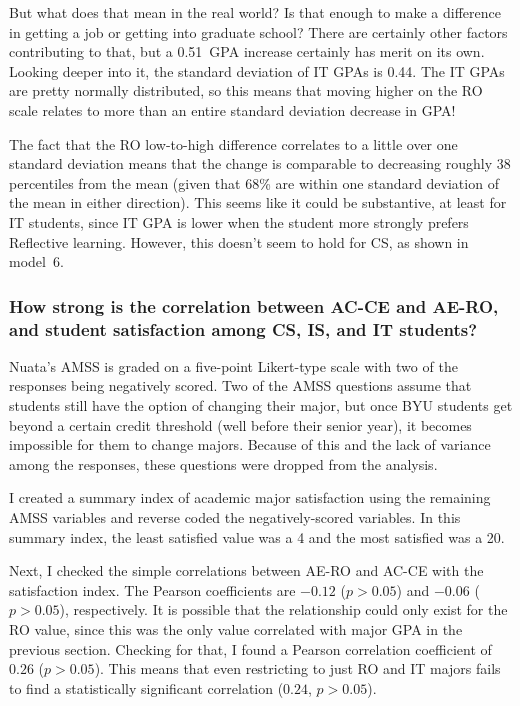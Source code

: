 But what does that mean in the real world? Is that enough to make a difference in getting a job or getting into graduate school? There are certainly other factors contributing to that, but a 0.51~GPA increase certainly has merit on its own. Looking deeper into it, the standard deviation of IT GPAs is 0.44. The IT GPAs are pretty normally distributed, so this means that moving higher on the RO scale relates to more than an entire standard deviation decrease in GPA!

The fact that the RO low-to-high difference correlates to a little over one standard deviation means that the change is comparable to decreasing roughly 38 percentiles from the mean (given that 68\% are within one standard deviation of the mean in either direction). This seems like it could be substantive, at least for IT students, since IT GPA is lower when the student more strongly prefers Reflective learning. However, this doesn't seem to hold for CS, as shown in model~6.

\subsubsection{How strong is the correlation between AC-CE and AE-RO, and student satisfaction among CS, IS, and IT students?}
Nuata's AMSS is graded on a five-point Likert-type scale with two of the responses being negatively scored. Two of the AMSS questions assume that students still have the option of changing their major, but once BYU students get beyond a certain credit threshold (well before their senior year), it becomes impossible for them to change majors. Because of this and the lack of variance among the responses, these questions were dropped from the analysis.

I created a summary index of academic major satisfaction using the remaining AMSS variables and reverse coded the negatively-scored variables. In this summary index, the least satisfied value was a 4 and the most satisfied was a 20.

Next, I checked the simple correlations between AE-RO and AC-CE with the satisfaction index. The Pearson coefficients are $-0.12$ ($p>0.05$) and $-0.06$ ($p>0.05$), respectively. It is possible that the relationship could only exist for the RO value, since this was the only value correlated with major GPA in the previous section. Checking for that, I found a Pearson correlation coefficient of $0.26$ ($p>0.05$). This means that even restricting to just RO and IT majors fails to find a statistically significant correlation ($0.24$, $p>0.05$).

